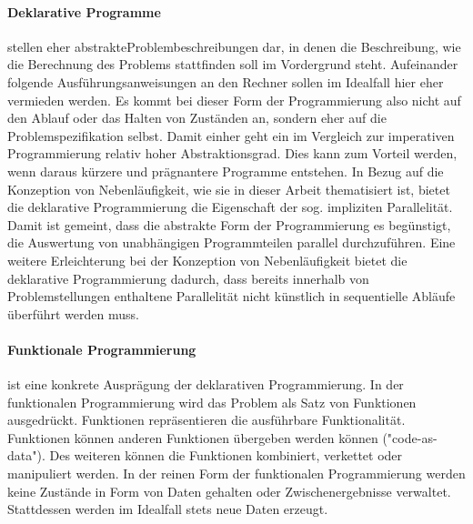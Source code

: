 \documentclass[12pt,oneside,a4paper,bibtotoc,liststotoc]{scrreprt}
\begin{document}
\paragraph{Deklarative Programme} stellen eher \glqq abstrakte\grqq Problembeschreibungen dar, in denen die Beschreibung, wie die Berechnung des Problems stattfinden soll im Vordergrund steht. Aufeinander folgende Ausführungsanweisungen an den Rechner sollen im Idealfall hier eher vermieden werden. Es kommt bei dieser Form der Programmierung also nicht auf den Ablauf oder das Halten von Zuständen an, sondern eher auf die Problemspezifikation selbst. Damit einher geht ein im Vergleich zur imperativen Programmierung relativ hoher Abstraktionsgrad. Dies kann zum Vorteil werden, wenn daraus kürzere und prägnantere Programme entstehen. In Bezug auf die Konzeption von Nebenläufigkeit, wie sie in dieser Arbeit thematisiert ist, bietet die deklarative Programmierung die Eigenschaft der sog. impliziten Parallelität. Damit ist gemeint, dass die abstrakte Form der Programmierung es begünstigt, die Auswertung von unabhängigen Programmteilen parallel durchzuführen. Eine weitere Erleichterung bei der Konzeption von Nebenläufigkeit bietet die deklarative Programmierung dadurch, dass bereits innerhalb von Problemstellungen enthaltene Parallelität nicht künstlich in sequentielle Abläufe überführt werden muss.\cite[vgl. S.5 ff.]{declarativProgrammingScript} 
\paragraph{Funktionale Programmierung} ist eine konkrete Ausprägung der deklarativen Programmierung. In der funktionalen Programmierung wird das Problem als Satz von Funktionen ausgedrückt. Funktionen repräsentieren die ausführbare Funktionalität. Funktionen können anderen Funktionen übergeben werden können ("code-as-data"). Des weiteren können die Funktionen kombiniert, verkettet oder manipuliert werden. In der reinen Form der funktionalen Programmierung werden keine Zustände in Form von Daten gehalten oder Zwischenergebnisse verwaltet. Stattdessen werden im Idealfall stets neue Daten erzeugt.\cite[]{funcProgrJava}   
\end{document}
